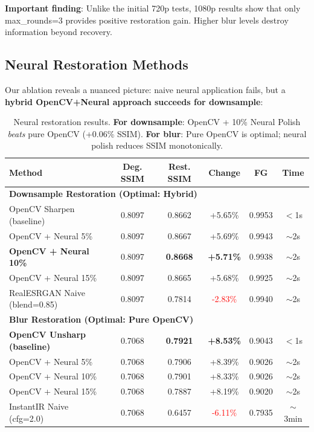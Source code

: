 \documentclass[11pt,a4paper]{article}
\begin{document}
\textbf{Important finding}: Unlike the initial 720p tests, 1080p results show that only max\_rounds=3 provides positive restoration gain. Higher blur levels destroy information beyond recovery.

\subsection{Neural Restoration Methods}
\label{sec:neural-success}

Our ablation reveals a nuanced picture: naive neural application fails, but a \textbf{hybrid OpenCV+Neural approach succeeds for downsample}:

\begin{table}[h]
\centering
\begin{tabular}{lccccc}
\toprule
\textbf{Method} & \textbf{Deg. SSIM} & \textbf{Rest. SSIM} & \textbf{Change} & \textbf{FG} & \textbf{Time} \\
\midrule
\multicolumn{6}{l}{\textbf{Downsample Restoration (Optimal: Hybrid)}} \\
\midrule
OpenCV Sharpen (baseline) & 0.8097 & 0.8662 & +5.65\% & 0.9953 & $<$1s \\
OpenCV + Neural 5\% & 0.8097 & 0.8667 & +5.69\% & 0.9943 & $\sim$2s \\
\textbf{OpenCV + Neural 10\%} & 0.8097 & \textbf{0.8668} & \textbf{+5.71\%} & 0.9938 & $\sim$2s \\
OpenCV + Neural 15\% & 0.8097 & 0.8665 & +5.68\% & 0.9925 & $\sim$2s \\
RealESRGAN Naive (blend=0.85) & 0.8097 & 0.7814 & \textcolor{red}{-2.83\%} & 0.9940 & $\sim$2s \\
\midrule
\multicolumn{6}{l}{\textbf{Blur Restoration (Optimal: Pure OpenCV)}} \\
\midrule
\textbf{OpenCV Unsharp (baseline)} & 0.7068 & \textbf{0.7921} & \textbf{+8.53\%} & 0.9043 & $<$1s \\
OpenCV + Neural 5\% & 0.7068 & 0.7906 & +8.39\% & 0.9026 & $\sim$2s \\
OpenCV + Neural 10\% & 0.7068 & 0.7901 & +8.33\% & 0.9026 & $\sim$2s \\
OpenCV + Neural 15\% & 0.7068 & 0.7887 & +8.19\% & 0.9020 & $\sim$2s \\
InstantIR Naive (cfg=2.0) & 0.7068 & 0.6457 & \textcolor{red}{-6.11\%} & 0.7935 & $\sim$3min \\
\bottomrule
\end{tabular}
\caption{Neural restoration results. \textbf{For downsample}: OpenCV + 10\% Neural Polish \emph{beats} pure OpenCV (+0.06\% SSIM). \textbf{For blur}: Pure OpenCV is optimal; neural polish reduces SSIM monotonically.}
\label{tab:neural}
\end{table}
\end{document}
